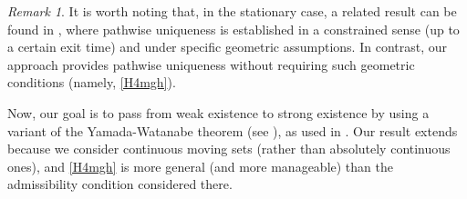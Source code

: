 \documentclass[preprint,12pt]{elsarticle}
\theoremstyle{plain}
\theoremstyle{definition}
\theoremstyle{remark}
\newtheorem{remark}[theorem]{Remark}
\begin{document}
\begin{remark}
    It is worth noting that, in the stationary case, a related result can be found in \cite[Lemma 5.5]{MR873889}, where pathwise uniqueness is established in a constrained sense (up to a certain exit time) and under specific geometric assumptions. In contrast, our approach provides pathwise uniqueness without requiring such geometric conditions (namely, \ref{H4mgh}).
\end{remark}

Now, our goal is to pass from weak existence to strong existence by using a variant of the Yamada-Watanabe theorem (see \cite{MR278420}), as used in \cite{MR1392450}. Our result extends \cite[Theorem 3.11]{MR2812587} because we consider continuous moving sets (rather than absolutely continuous ones),  and  \ref{H4mgh} is more general (and more manageable) than the admissibility condition considered there.
	
\end{document}
